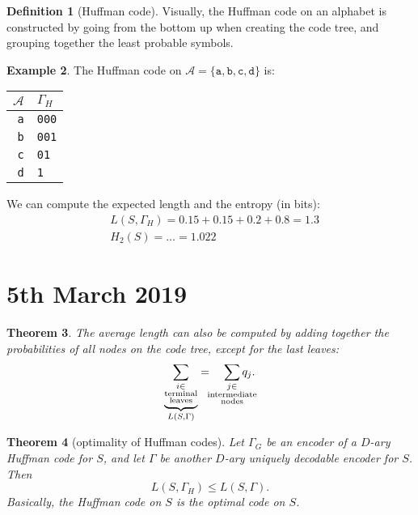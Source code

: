 \documentclass{report}
\theoremstyle{plain}
\newtheorem{thm}{Theorem}
\theoremstyle{definition}
\newtheorem{exmp}[thm]{Example}
\newtheorem{defn}[thm]{Definition}
\theoremstyle{remark}
\begin{document}
\begin{defn}[Huffman code]
 Visually, the Huffman code on an alphabet is constructed by going from the bottom up when creating the code tree, and grouping together the least probable symbols.
\end{defn}
\begin{exmp} The Huffman code on $\mathcal A = \{\texttt a, \texttt b, \texttt c, \texttt d\}$ is:
	\begin{center}
	\begin{tabular}{r | l}
		$\mathcal A$ & $\Gamma_H$ \\ \hline
		\texttt a & \texttt{000} \\
		\texttt b & \texttt{001} \\
		\texttt c & \texttt{01} \\
		\texttt d & \texttt{1}
	\end{tabular}
	\end{center}
 We can compute the expected length and the entropy (in bits):
	\begin{align*}
		&L(S, \Gamma_H) = 0.15 + 0. 15 + 0.2 + 0.8 = 1.3 \\
		&H_2(S) = \ldots = 1.022
	\end{align*}
\end{exmp}

\section{5th March 2019}

\begin{thm}
	The average length can also be computed by adding together the probabilities of all nodes on the code tree, except for the last leaves:
	\begin{equation}
		\underbrace{\sum_{\substack{i \in \\ \text{terminal} \\ \text{leaves}}}}_{L(S, \Gamma)} = \quad \sum_{\mathclap{\substack{j \in \\ \text{intermediate} \\ \text{nodes}}}} q_j.
	\end{equation}
\end{thm}

\begin{thm}[optimality of Huffman codes]
	Let $\Gamma_G$ be an encoder of a $D$-ary Huffman code for $S$, and let $\Gamma$ be another $D$-ary uniquely decodable encoder for $S$. Then
	\begin{equation}
		L(S, \Gamma_H) \leq L(S, \Gamma).
	\end{equation}
	Basically, the Huffman code on $S$ is the optimal code on $S$.
\end{thm}
\end{document}
